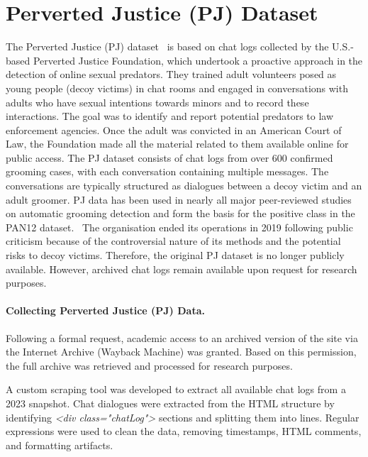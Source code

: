 \section{Perverted Justice (PJ) Dataset}
The Perverted Justice (PJ) dataset~\cite{pj} is based on chat logs collected by the U.S.-based Perverted Justice Foundation, which undertook a proactive approach in the detection of online sexual predators. They trained adult volunteers posed as young people (decoy victims) in chat rooms and engaged in conversations with adults who have sexual intentions towards minors and to record these interactions. The goal was to identify and report potential predators to law enforcement agencies. Once the adult was convicted in an American Court of Law, the Foundation made all the material related to them available online for public access. The PJ dataset consists of chat logs from over 600 confirmed grooming cases, with each conversation containing multiple messages. The conversations are typically structured as dialogues between a decoy victim and an adult groomer. PJ data has been used in nearly all major peer-reviewed studies on automatic grooming detection and form the basis for the positive class in the PAN12 dataset.~\cite{inches2012pan} 
The organisation ended its operations in 2019 following public criticism because of the controversial nature of its methods and the potential risks to decoy victims. Therefore, the original PJ dataset is no longer publicly available. However, archived chat logs remain available upon request for research purposes.~\cite{pj}


\paragraph{Collecting Perverted Justice (PJ) Data.}

 Following a formal request, academic access to an archived version of the site via the Internet Archive (Wayback Machine) was granted. Based on this permission, the full archive was retrieved and processed for research purposes.

A custom scraping tool was developed to extract all available chat logs from a 2023 snapshot. Chat dialogues were extracted from the HTML structure by identifying \textit{<div class="chatLog">} sections and splitting them into lines. Regular expressions were used to clean the data, removing timestamps, HTML comments, and formatting artifacts. 

